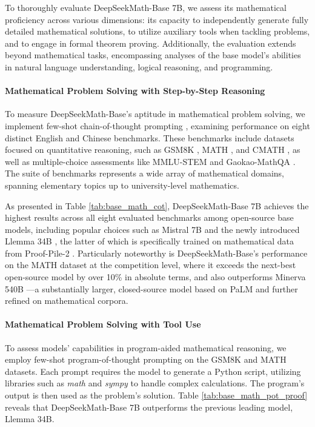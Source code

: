 To thoroughly evaluate DeepSeekMath-Base 7B, we assess its mathematical proficiency across various dimensions: its capacity to independently generate fully detailed mathematical solutions, to utilize auxiliary tools when tackling problems, and to engage in formal theorem proving. Additionally, the evaluation extends beyond mathematical tasks, encompassing analyses of the base model’s abilities in natural language understanding, logical reasoning, and programming.

\paragraph{Mathematical Problem Solving with Step-by-Step Reasoning}

To measure DeepSeekMath-Base’s aptitude in mathematical problem solving, we implement few-shot chain-of-thought prompting \citep{cot}, examining performance on eight distinct English and Chinese benchmarks. These benchmarks include datasets focused on quantitative reasoning, such as GSM8K \citep{gsm8k}, MATH \citep{MATH}, and CMATH \citep{wei2023cmath}, as well as multiple-choice assessments like MMLU-STEM \citep{mmlu} and Gaokao-MathQA \citep{agieval}. The suite of benchmarks represents a wide array of mathematical domains, spanning elementary topics up to university-level mathematics.

As presented in Table \ref{tab:base_math_cot}, DeepSeekMath-Base 7B achieves the highest results across all eight evaluated benchmarks among open-source base models, including popular choices such as Mistral 7B \citep{mistral} and the newly introduced Llemma 34B \citep{llemma}, the latter of which is specifically trained on mathematical data from Proof-Pile-2 \citep{llemma}. Particularly noteworthy is DeepSeekMath-Base’s performance on the MATH dataset at the competition level, where it exceeds the next-best open-source model by over 10\% in absolute terms, and also outperforms Minerva 540B \citep{minerva}—a substantially larger, closed-source model based on PaLM \citep{palm} and further refined on mathematical corpora.

\paragraph{Mathematical Problem Solving with Tool Use} To assess models’ capabilities in program-aided mathematical reasoning, we employ few-shot program-of-thought prompting \citep{pot,pal} on the GSM8K and MATH datasets. Each prompt requires the model to generate a Python script, utilizing libraries such as \textit{math} and \textit{sympy} to handle complex calculations. The program’s output is then used as the problem’s solution. Table \ref{tab:base_math_pot_proof} reveals that DeepSeekMath-Base 7B outperforms the previous leading model, Llemma 34B.

